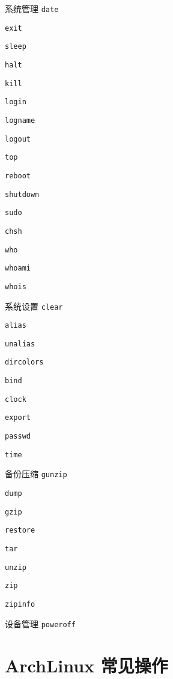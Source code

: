 \documentclass{ctexart}
\begin{document}
\begin{mybox}{系统管理}
    \texttt{date}

    \texttt{exit}

    \texttt{sleep}

    \texttt{halt}
    
    \texttt{kill}

    \texttt{login}

    \texttt{logname}

    \texttt{logout}

    \texttt{top}

    \texttt{reboot}

    \texttt{shutdown}
    
    \texttt{sudo}

    \texttt{chsh}

    \texttt{who}

    \texttt{whoami}

    \texttt{whois}
\end{mybox}

\begin{mybox}{系统设置}
    \texttt{clear}

    \texttt{alias}

    \texttt{unalias}

    \texttt{dircolors}

    \texttt{bind}

    \texttt{clock}

    \texttt{export}

    \texttt{passwd}

    \texttt{time}
\end{mybox}

\begin{mybox}{备份压缩}
    \texttt{gunzip}

    \texttt{dump}
    
    \texttt{gzip}

    \texttt{restore}

    \texttt{tar}
    
    \texttt{unzip}

    \texttt{zip}

    \texttt{zipinfo}
\end{mybox}


\begin{mybox}{设备管理}
    \texttt{poweroff}
\end{mybox}

\clearpage
\section{ArchLinux 常见操作}
\end{document}

